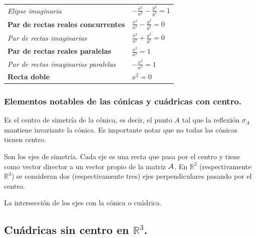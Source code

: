 \vspace{.8cm}

\begin{tabular}{ll}
{\it Elipse imaginaria}  &
$
-\frac{{x}^2}{a^2} - \frac{{y}^2}{b^2} = 1
$
\vspace{.4cm}
\\

{\bf  Par de rectas reales concurrentes}  &
$
\frac{{x}^2}{a^2} - \frac{{y}^2}{b^2}=0
$
\vspace{.4cm}
\\
{\it Par de rectas imaginarias} &
$
\frac{{x}^2}{a^2} + \frac{{y}^2}{b^2}=0
$
\vspace{.4cm}
\\
{\bf  Par de rectas reales paralelas}  &
$
\frac{{x}^2}{a^2}=1
$
\vspace{.4cm}
\\
{\it Par de rectas imaginarias paralelas}  &
$
-\frac{{x}^2}{a^2} = 1
$
\vspace{.4cm}
\\
{\bf  Recta doble}  &
$
{{x}^2} = 0
$
\vspace{.3cm}
\\
\end{tabular}
\subsubsection{\bf  Elementos notables de las c\'onicas y cu\'adricas con centro.}

\begin{ndef}[Centro]
	Es el centro de simetría de la cónica, es decir, el punto $A$ tal que la reflexión $\sigma_A$ mantiene invariante la cónica. Es importante notar que no todas las cónicas tienen centro.
\end{ndef}


\begin{ndef}[Ejes]
	 Son los ejes de simetr\'ia. Cada eje es una recta que pasa por el centro y tiene como vector director a un vector propio de la matriz $\cal A$. En $\mathbb{R}^2$ (respectivamente $\mathbb{R}^3$) se consideran dos (respectivamente tres)  ejes perpendiculares pasando por el centro.
\end{ndef}

\begin{ndef}[Vértices]
	La intersecci\'on de los ejes con la c\'onica o cu\'adrica.
\end{ndef}


\subsection{\bf Cu\'adricas sin centro en $\mathbb{R}^3$.}


